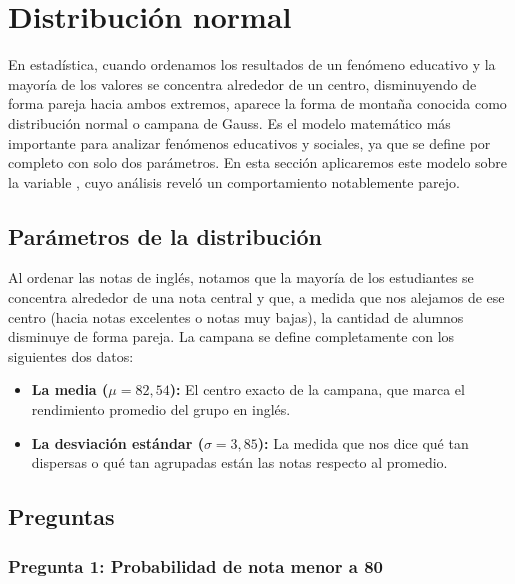 \section{Distribución normal}
En estadística, cuando ordenamos los resultados de un fenómeno educativo y la mayoría de los
valores se concentra alrededor de un centro, disminuyendo de forma pareja hacia ambos extremos,
aparece la forma de montaña conocida como distribución normal o campana de Gauss. Es el modelo
matemático más importante para analizar fenómenos educativos y sociales, ya que se define por
completo con solo dos parámetros. En esta sección aplicaremos este modelo sobre la variable
, cuyo análisis reveló un comportamiento notablemente parejo.

\subsection{Parámetros de la distribución}
Al ordenar las notas de inglés, notamos que la mayoría de los estudiantes se concentra alrededor
de una nota central y que, a medida que nos alejamos de ese centro (hacia notas excelentes o notas
muy bajas), la cantidad de alumnos disminuye de forma pareja. La campana se define completamente
con los siguientes dos datos:
\begin{itemize}
	\item \textbf{La media ($\mu = 82{,}54$):} El centro exacto de la campana, que marca el
	rendimiento promedio del grupo en inglés.
	\item \textbf{La desviación estándar ($\sigma = 3{,}85$):} La medida que nos dice qué tan
	dispersas o qué tan agrupadas están las notas respecto al promedio.
\end{itemize}

\AnalisisDescriptivo



\subsection{Preguntas}

\subsubsection{Pregunta 1: Probabilidad de nota menor a 80}

